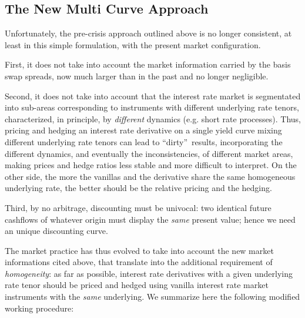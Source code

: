 \documentclass[11pt,reqno]{amsart}
\begin{document}
\subsection{\label{SecMultiCurve}The New Multi Curve Approach}
Unfortunately, the pre-crisis approach outlined above is no longer consistent, at least in this simple formulation, with the present market configuration.

First, it does not take into account the market information carried by the basis swap spreads, now much larger than in the past and no longer negligible.

Second, it does not take into account that the interest rate market is segmentated into sub-areas corresponding to instruments with different underlying rate tenors, characterized, in principle, by \textit{different} dynamics (e.g. short rate processes). Thus, pricing and hedging an interest rate derivative on a single yield curve mixing different underlying rate tenors can lead to \textquotedblleft dirty\textquotedblright\ results, incorporating the different dynamics, and eventually the inconsistencies, of different market areas, making prices and hedge ratios less stable and more difficult to interpret. On the other side, the more the vanillas and the derivative share the same homogeneous underlying rate, the better should be the relative pricing and the hedging.

Third, by no arbitrage, discounting must be univocal: two identical future cashflows of whatever origin must display the \textit{same} present value; hence we need an unique discounting curve.

The market practice has thus evolved to take into account the new market informations cited above, that translate into the additional requirement of \textit{homogeneity}: as far as possible, interest rate derivatives with a given underlying rate tenor should be priced and hedged using vanilla interest rate market instruments with the \textit{same} underlying. We summarize here the following modified working procedure:
\end{document}

